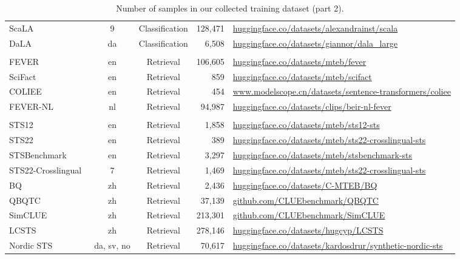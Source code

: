 \begin{table}[th]
{\begin{tabular}{lccrm{9cm}}
ScaLA~\citep{2023ScaLA} & 9 & Classification & 128,471 & \url{huggingface.co/datasets/alexandrainst/scala} \\
DaLA~\citep{2025DaLA} & da & Classification & 6,508 & \url{huggingface.co/datasets/giannor/dala_large} \\
\midrule
\rowcolor{gray!15} \multicolumn{5}{c}{Claim Verification}\\
FEVER~\citep{2018FEVER} & en & Retrieval & 106,605 & \url{huggingface.co/datasets/mteb/fever} \\
SciFact~\citep{2020SciFact} & en & Retrieval & 859 & \url{huggingface.co/datasets/mteb/scifact} \\
COLIEE~\citep{2022COLIEE} & en & Retrieval & 454 & \url{www.modelscope.cn/datasets/sentence-transformers/coliee} \\
FEVER-NL~\citep{2025beir-nl} & nl & Retrieval & 94,987 & \url{huggingface.co/datasets/clips/beir-nl-fever} \\
\midrule
\rowcolor{gray!15} \multicolumn{5}{c}{STS}\\
STS12~\citep{2012STS12} & en & Retrieval & 1,858 & \url{huggingface.co/datasets/mteb/sts12-sts} \\
STS22~\citep{2022STS22} & en & Retrieval & 389 & \url{huggingface.co/datasets/mteb/sts22-crosslingual-sts} \\
STSBenchmark~\citep{2021STSBenchmark} & en & Retrieval & 3,297 & \url{huggingface.co/datasets/mteb/stsbenchmark-sts} \\
STS22-Crosslingual~\citep{2022STS22} & 7 & Retrieval & 1,469 & \url{huggingface.co/datasets/mteb/sts22-crosslingual-sts} \\
BQ~\citep{2023CMTEB} & zh & Retrieval & 2,436 & \url{huggingface.co/datasets/C-MTEB/BQ} \\
QBQTC~\citep{2021qbqtc} & zh & Retrieval & 37,139 & \url{github.com/CLUEbenchmark/QBQTC} \\
SimCLUE~\citep{2022simclue} & zh & Retrieval & 213,301 & \url{github.com/CLUEbenchmark/SimCLUE} \\
LCSTS~\citep{2015LCSTS} & zh & Retrieval & 278,146 & \url{huggingface.co/datasets/hugcyp/LCSTS} \\
Nordic STS~\citep{2025nordic_sts} & da, sv, no & Retrieval & 70,617 & \url{huggingface.co/datasets/kardosdrur/synthetic-nordic-sts} \\
    \bottomrule
    \end{tabular}
    }
    \caption{Number of samples in our collected training dataset (part 2).}
    \label{tab:data-2}
\end{table}